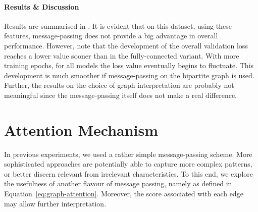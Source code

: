 \documentclass[
	fontsize=10pt, %
	twoside=true, %
	secnumdepth=1, %
  toc=indentunnumbered %
]{kaobook}
\begin{document}
\paragraph{Results \& Discussion} Results are summarised in
. It is evident that on this dataset,
using these features, message-passing does not provide a big
advantage in overall performance.
However, note that the development of the overall validation loss reaches a
lower value sooner than in the fully-connected variant. With more training
epochs, for all models the loss value eventually begins to fluctuate. This
development is much smoother if message-passing on the bipartite graph is used.
Further, the results on the choice of graph interpretation are probably not meaningful
since the message-passing itself does not make a real difference.






\section{Attention Mechanism}

In previous experiments, we used a rather simple message-passing scheme. More
sophisticated approaches are potentially able to capture more complex patterns,
or better discern relevant from irrelevant characteristics. To this end, we
explore the usefulness of another flavour of message passing, namely  as defined in Equation~\ref{eq:graph-attention}. Moreover, the
score associated with each edge may allow further interpretation.


\end{document}
